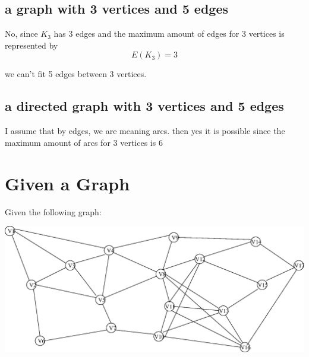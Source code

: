 \documentclass[a4paper,12pt]{article}
\begin{document}
\subsection{a graph with 3 vertices and 5 edges }
No, since $K_{3}$ has 3 edges and the maximum amount of edges for 3 vertices
is represented by 
  \[ E(K_{3}) = 3\]
\begin{center}
\end{center}
we can't fit 5 edges between 3 vertices.
\subsection{a directed graph with 3 vertices and 5 edges}
I assume that by edges, we are meaning arcs.
then yes it is possible since the maximum amount of arcs for 3 vertices is 6
\begin{center}
\end{center}

\section{Given a Graph} Given the following graph:

\begin{center}
\includegraphics[scale=0.7]{graph.eps}
\end{center}
\end{document}
